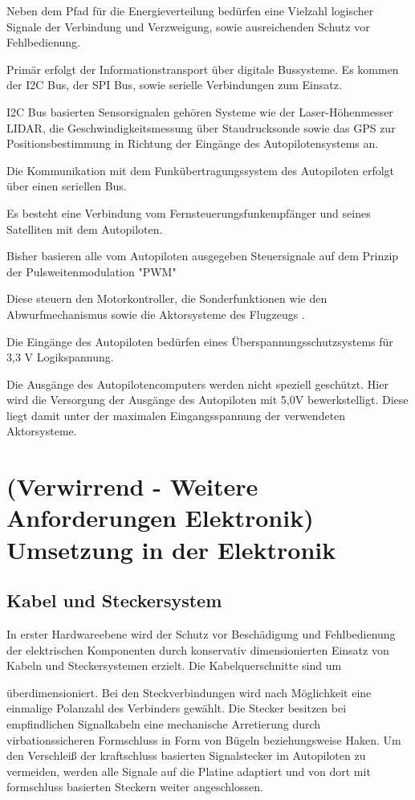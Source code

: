 Neben dem Pfad für die Energieverteilung bedürfen eine Vielzahl logischer Signale der Verbindung und Verzweigung, sowie ausreichenden Schutz vor Fehlbedienung.

Primär erfolgt der Informationstransport über digitale Bussysteme. Es kommen der I2C Bus, der SPI Bus, sowie serielle Verbindungen zum Einsatz.

I2C  Bus basierten Sensorsignalen gehören Systeme wie der Laser-Höhenmesser LIDAR, die Geschwindigkeitsmessung über Staudrucksonde sowie das GPS zur Positionsbestimmung in Richtung der Eingänge des Autopilotensystems an.

Die Kommunikation mit dem Funkübertragungssystem des Autopiloten erfolgt über einen seriellen Bus.

Es besteht eine Verbindung vom Fernsteuerungsfunkempfänger und seines Satelliten mit dem Autopiloten.

Bisher basieren alle vom Autopiloten ausgegeben Steuersignale auf dem Prinzip der Pulsweitenmodulation "PWM"

Diese steuern den Motorkontroller, die Sonderfunktionen wie den Abwurfmechanismus sowie die Aktorsysteme des Flugzeugs .


Die Eingänge des Autopiloten bedürfen eines Überspannungsschutzsystems für 3,3 V Logikspannung.

Die Ausgänge des Autopilotencomputers werden nicht speziell geschützt. Hier wird die Versorgung der Ausgänge des Autopiloten mit 5,0V bewerkstelligt. Diese liegt damit unter der  maximalen Eingangsspannung der verwendeten Aktorsysteme.


\section{(Verwirrend - Weitere Anforderungen Elektronik) Umsetzung in der Elektronik}

\subsection{Kabel und Steckersystem}

In erster Hardwareebene  wird der Schutz vor Beschädigung und Fehlbedienung der elektrischen Komponenten durch konservativ dimensionierten Einsatz von Kabeln und Steckersystemen erzielt. Die Kabelquerschnitte sind um
\begin{comment} Prozentzahl ?\end{comment}
überdimensioniert. Bei den Steckverbindungen wird nach Möglichkeit eine einmalige Polanzahl des Verbinders gewählt.
Die Stecker besitzen bei empfindlichen Signalkabeln eine mechanische Arretierung durch virbationssicheren Formschluss in Form von Bügeln beziehungsweise Haken.
Um den Verschleiß der kraftschluss basierten Signalstecker im Autopiloten zu vermeiden, werden alle Signale auf die Platine adaptiert und von dort mit formschluss basierten Steckern weiter angeschlossen.

